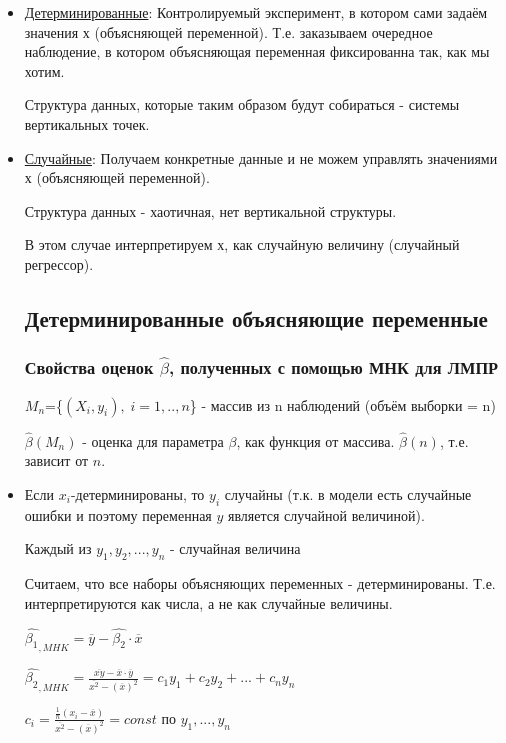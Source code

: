 \documentclass{article}
\begin{document}
\begin{itemize}
\item \underline{Детерминированные}: Контролируемый эксперимент, в котором сами задаём значения х (объясняющей переменной).
Т.е. заказываем очередное наблюдение, в котором объясняющая переменная фиксированна так, как мы хотим.

Структура данных, которые таким образом будут собираться - системы вертикальных точек.

\item \underline{Случайные}: Получаем конкретные данные и не можем управлять значениями х (объясняющей переменной).

Структура данных - хаотичная, нет вертикальной структуры.

В этом случае интерпретируем х, как случайную величину (случайный регрессор).

\subsection{Детерминированные объясняющие переменные}
\subsubsection{Свойства оценок $\hat{\beta}$, полученных с помощью МНК для ЛМПР}

$M_n$=\{$(X_i, y_i), \;  i=1,..,n$\} - массив из n наблюдений (объём выборки = n)

$\hat{\beta}(M_n)$ - оценка для параметра $\beta$, как функция от массива. $\hat{\beta}(n)$, т.е. зависит от $n$.

\item Если $x_i$-детерминированы, то $y_i$ случайны (т.к. в модели есть случайные ошибки и поэтому переменная $y$ является случайной величиной). 

Каждый из $y_1, y_2, ... , y_n$ - случайная величина

\vspace{2ex}
Считаем, что все наборы объясняющих переменных - детерминированы. Т.е. интерпретируются как числа, а не как случайные величины.


$\hat{\beta_1}_{,MHK} = \overline{y} - \hat{\beta_2}\cdot\overline{x}$

$\hat{\beta_2}_{,MHK}=\frac{\overline{xy}-\overline{x}\cdot\overline{y}}{\overline{x^2}-(\overline{x})^2} = c_1y_1+c_2y_2+...+c_ny_n$

$c_i=\frac{\frac{1}{n}(x_i-\overline{x})}{\overline{x^2}-(\overline{x})^2} = const$ по $y_1, ..., y_n$



\end{itemize}
\end{document}
